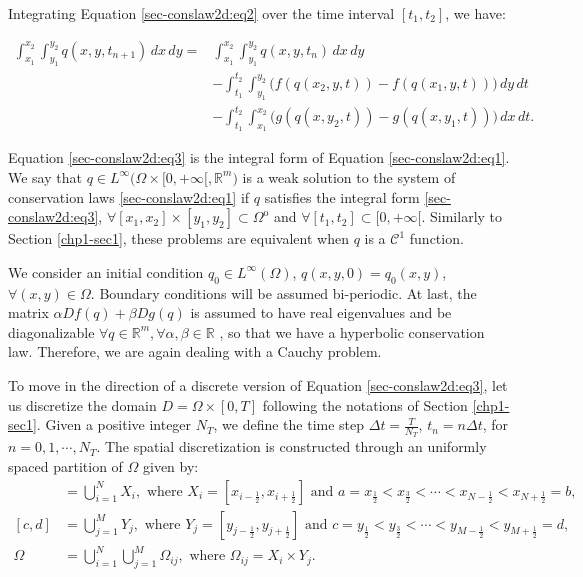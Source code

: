 Integrating Equation \eqref{sec-conslaw2d:eq2} over the time interval $[t_1,t_2]$, 
we have:

\begin{align}
	\label{sec-conslaw2d:eq3}
	\int_{x_1}^{x_2} \int_{y_1}^{y_2}
	{q}(x, y, t_{n+1}) \,dx \,dy = &\int_{x_1}^{x_2} \int_{y_1}^{y_2}
	{q}(x, y, t_n) \,dx \,dy \\ \nonumber
	&-\int_{t_1}^{t_2} \int_{y_1}^{y_2} \bigg({f}({q}(x_2, y, t))
	-{f}({q}(x_1, y, t)) \bigg) \,dy \,dt\\ \nonumber
	&-\int_{t_1}^{t_2} \int_{x_1}^{x_2} \bigg({g}({q}(x, y_2, t))
	-{g}({q}(x, y_1, t)) \bigg) \,dx \,dt.
\end{align}

Equation \eqref{sec-conslaw2d:eq3} is the integral form of Equation 
\eqref{sec-conslaw2d:eq1}. We say that ${q} \in 
L^{\infty}{(\Omega \times [0, +\infty[}, \mathbb{R}^m)$ is a weak
solution to the system of conservation laws  \eqref{sec-conslaw2d:eq1} if ${q}$
satisfies the integral form \eqref{sec-conslaw2d:eq3}, 
$\forall [x_1,x_2]\times[y_1,y_2] \subset \Omega^{\mathrm{o}}$ and 
$\forall [t_1,t_2] \subset [0,+\infty[$.
Similarly to Section \ref{chp1-sec1}, these problems are equivalent
when  ${q}$ is a $\mathcal{C}^1$ function.

We consider an initial condition ${q_0} \in L^{\infty}{(\Omega)}$,
${q}(x,y,0) =  {q_0}(x,y)$, $\forall (x,y) \in \Omega$.
Boundary conditions will be assumed bi-periodic.
At last, the matrix $\alpha D{f}(q) + \beta D{g}(q)$ is assumed to have
real eigenvalues and be diagonalizable
$\forall q \in \mathbb{R}^m , \forall \alpha, \beta \in \mathbb{R}$
\citep{leveque:1990}, so that we have a hyperbolic conservation law.
Therefore, we are again dealing with a Cauchy problem. 

To move in the direction of a discrete version of Equation \eqref{sec-conslaw2d:eq3},
let us discretize the domain $D = \Omega \times [0,T]$ following 
the notations of Section \ref{chp1-sec1}.
Given a positive integer $N_T$, we define the time step 
$\Delta t = \frac{T}{N_T}$, $t_n = n \Delta t$, for $n = 0, 1 ,\cdots, N_T$.
The spatial discretization is constructed through an uniformly spaced partition of $\Omega$ given by:
\begin{align}
	[a,b] &= \bigcup_{i=1}^N X_i, 
	\text{ where } X_i= [x_{i-\frac{1}{2}}, x_{i+\frac{1}{2}}] \text{ and } 
	a = x_{\frac{1}{2}} < x_{\frac{3}{2}} < \cdots < x_{N-\frac{1}{2}} < x_{N+\frac{1}{2}} = b, \\
	[c,d] &= \bigcup_{j=1}^M Y_j, 
\text{ where } Y_j= [y_{j-\frac{1}{2}}, y_{j+\frac{1}{2}}] \text{ and } 
c = y_{\frac{1}{2}} < y_{\frac{3}{2}} < \cdots < y_{M-\frac{1}{2}} < y_{M+\frac{1}{2}} = d, \\
    \Omega &=  \bigcup_{i=1}^N \bigcup_{j=1}^M \Omega_{ij}, \text{ where } \Omega_{ij} = X_i \times Y_j.
\end{align}

